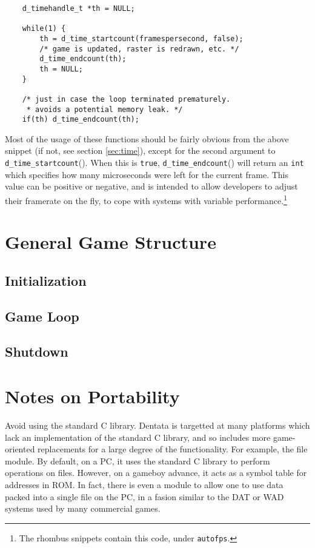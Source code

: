 \begin{verbatim}
    d_timehandle_t *th = NULL;

    while(1) {
        th = d_time_startcount(framespersecond, false);
        /* game is updated, raster is redrawn, etc. */
        d_time_endcount(th);
        th = NULL;
    }

    /* just in case the loop terminated prematurely.
     * avoids a potential memory leak. */
    if(th) d_time_endcount(th);
\end{verbatim}

Most of the usage of these functions should be fairly obvious from
the above snippet (if not, see section \ref{sec:time}), except for
the second argument to {\tt d\_time\_startcount}(). When this is
{\tt true}, {\tt d\_time\_endcount}() will return an {\tt int} which
specifies how many microseconds were left for the current frame.
This value can be positive or negative, and is intended to allow
developers to adjust their framerate on the fly, to cope with systems
with variable performance.\footnote{The rhombus snippets contain this
code, under {\tt autofps}.}

\section{General Game Structure}

\subsection{Initialization}

\subsection{Game Loop}
\subsection{Shutdown}

\section{Notes on Portability}

Avoid using the standard C library. Dentata is targetted at many
platforms which lack an implementation of the standard C library, and
so includes more game-oriented replacements for a large degree of the
functionality. For example, the file module. By default, on a PC, it
uses the standard C library to perform operations on files. However,
on a gameboy advance, it acts as a symbol table for addresses in
ROM. In fact, there is even a module to allow one to use data packed
into a single file on the PC, in a fasion similar to the DAT or
WAD systems used by many commercial games.

